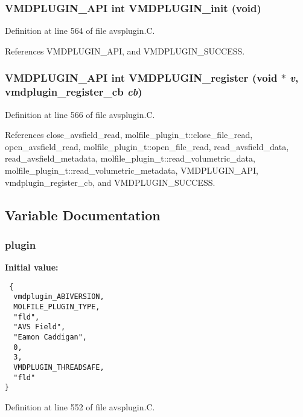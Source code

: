 \subsubsection{\setlength{\rightskip}{0pt plus 5cm}VMDPLUGIN\_\-API int VMDPLUGIN\_\-init (void)}\label{avsplugin_8C_a16}




Definition at line 564 of file avsplugin.C.

References VMDPLUGIN\_\-API, and VMDPLUGIN\_\-SUCCESS.
\subsubsection{\setlength{\rightskip}{0pt plus 5cm}VMDPLUGIN\_\-API int VMDPLUGIN\_\-register (void $\ast$ {\em v}, {\bf vmdplugin\_\-register\_\-cb} {\em cb})}\label{avsplugin_8C_a18}




Definition at line 566 of file avsplugin.C.

References close\_\-avsfield\_\-read, molfile\_\-plugin\_\-t::close\_\-file\_\-read, open\_\-avsfield\_\-read, molfile\_\-plugin\_\-t::open\_\-file\_\-read, read\_\-avsfield\_\-data, read\_\-avsfield\_\-metadata, molfile\_\-plugin\_\-t::read\_\-volumetric\_\-data, molfile\_\-plugin\_\-t::read\_\-volumetric\_\-metadata, VMDPLUGIN\_\-API, vmdplugin\_\-register\_\-cb, and VMDPLUGIN\_\-SUCCESS.

\subsection{Variable Documentation}
\subsubsection{ plugin\hspace{0.3cm}{\tt  [static]}}\label{avsplugin_8C_a1}


{\bf Initial value:}

\footnotesize\begin{verbatim} {
  vmdplugin_ABIVERSION,   
  MOLFILE_PLUGIN_TYPE,    
  "fld",                  
  "AVS Field",            
  "Eamon Caddigan",       
  0,                      
  3,                      
  VMDPLUGIN_THREADSAFE,   
  "fld"                   
}\end{verbatim}\normalsize 


Definition at line 552 of file avsplugin.C.